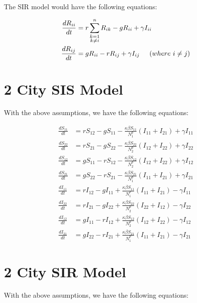 \documentclass[11pt]{article}
\begin{document}
The SIR model would have the following equations:

\begin{align*}
\frac{dR_{ii}}{dt} &= r\sum_{\substack{k=1 \\ k\neq i}}^{n} R_{ik} - gR_{ii} + \gamma I_{ii} \\
\frac{dR_{ij}}{dt} &= gR_{ii} - rR_{ij} + \gamma I_{ij} \hspace{0.2in} (where \ i \neq j) \\
\end{align*}


\section{2 City SIS Model}
With the above assumptions, we have the following equations:


\begin{align*}
\frac{dS_{11}}{dt} &= rS_{12} - g S_{11} - \frac{\kappa \beta S_{11}}{N_1^p} (I_{11} + I_{21}) + \gamma I_{11} \\
\frac{dS_{22}}{dt} &= rS_{21} - g S_{22} - \frac{\kappa \beta S_{22}}{N_2^p} (I_{12} + I_{22}) + \gamma I_{22} \\
\frac{dS_{12}}{dt} &= gS_{11}-rS_{12}-\frac{\kappa \beta S_{12}}{N_2^p} (I_{12} + I_{22}) + \gamma I_{12} \\
\frac{dS_{21}}{dt} &= gS_{22}-rS_{21}-\frac{\kappa \beta S_{21}}{N_1^p} (I_{11} + I_{21}) + \gamma I_{21} \\
\frac{dI_{11}}{dt} &= r I_{12} - g I_{11} + \frac{\kappa \beta S_{11}}{N_1^p} (I_{11} + I_{21}) - \gamma I_{11} \\
\frac{dI_{22}}{dt} &= rI_{21} - g I_{22} + \frac{\kappa \beta S_{22}}{N_2^p} (I_{22} + I_{12}) - \gamma I_{22} \\
\frac{dI_{12}}{dt} &= gI_{11}-rI_{12}+\frac{\kappa \beta S_{12}}{N_2^p} (I_{12} + I_{22}) - \gamma I_{12} \\
\frac{dI_{21}}{dt} &= gI_{22}-rI_{21}+\frac{\kappa \beta S_{21}}{N_1^p} (I_{11} + I_{21}) - \gamma I_{21}
\end{align*}

\section{2 City SIR Model}
With the above assumptions, we have the following equations:
\end{document}
